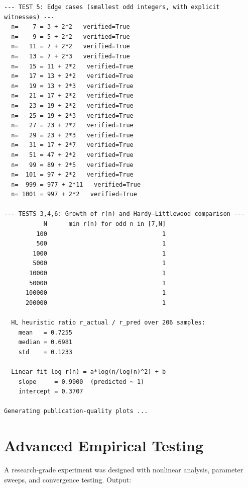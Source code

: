 \documentclass[11pt]{article}
\begin{document}
\begin{lstlisting}
--- TEST 5: Edge cases (smallest odd integers, with explicit witnesses) ---
  n=    7 = 3 + 2*2   verified=True
  n=    9 = 5 + 2*2   verified=True
  n=   11 = 7 + 2*2   verified=True
  n=   13 = 7 + 2*3   verified=True
  n=   15 = 11 + 2*2   verified=True
  n=   17 = 13 + 2*2   verified=True
  n=   19 = 13 + 2*3   verified=True
  n=   21 = 17 + 2*2   verified=True
  n=   23 = 19 + 2*2   verified=True
  n=   25 = 19 + 2*3   verified=True
  n=   27 = 23 + 2*2   verified=True
  n=   29 = 23 + 2*3   verified=True
  n=   31 = 17 + 2*7   verified=True
  n=   51 = 47 + 2*2   verified=True
  n=   99 = 89 + 2*5   verified=True
  n=  101 = 97 + 2*2   verified=True
  n=  999 = 977 + 2*11   verified=True
  n= 1001 = 997 + 2*2   verified=True

--- TESTS 3,4,6: Growth of r(n) and Hardy–Littlewood comparison ---
           N      min r(n) for odd n in [7,N]
         100                                1
         500                                1
        1000                                1
        5000                                1
       10000                                1
       50000                                1
      100000                                1
      200000                                1

  HL heuristic ratio r_actual / r_pred over 206 samples:
    mean   = 0.7255
    median = 0.6981
    std    = 0.1233

  Linear fit log r(n) = a*log(n/log(n)^2) + b
    slope     = 0.9900  (predicted ~ 1)
    intercept = 0.3707

Generating publication-quality plots ...

\end{lstlisting}


\section{Advanced Empirical Testing}

A research-grade experiment was designed with nonlinear analysis, parameter sweeps,
and convergence testing. Output:
\end{document}
